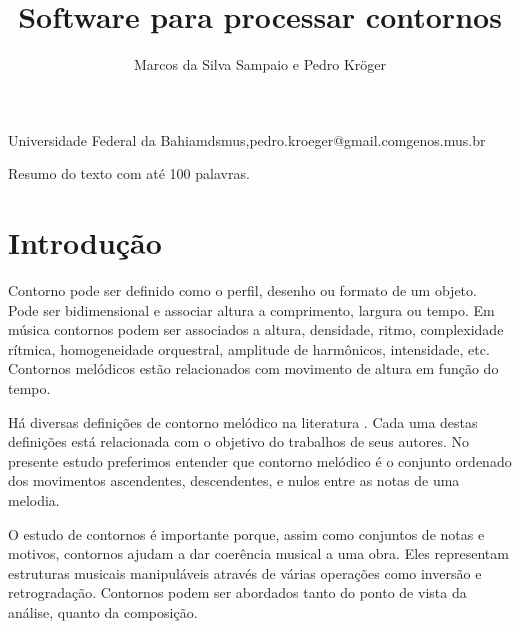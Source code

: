 \documentclass{article}
\begin{document}
\graphicspath{{figs-out/}{out/}}

\title{Software para processar contornos}
\author{Marcos da Silva Sampaio e Pedro Kröger}{Universidade Federal
  da Bahia}{{mdsmus,pedro.kroeger}@gmail.com}{genos.mus.br}

\begin{sumario}
  Resumo do texto com até 100 palavras.  
\end{sumario}








\section{Introdução}
\label{sec:introducao}

Contorno pode ser definido como o perfil, desenho ou formato de um
objeto. Pode ser bidimensional e associar altura a comprimento,
largura ou tempo. Em música contornos podem ser associados a altura,
densidade, ritmo, complexidade rítmica, homogeneidade orquestral,
amplitude de harmônicos, intensidade, etc. Contornos melódicos estão
relacionados com movimento de altura em função do tempo.

Há diversas definições de contorno melódico na literatura
\cite{piston59:harmony,toch77:shaping,schonberg:fundamentals,adams76:melodic,marvin.ea87:relating,morris87:composition,clifford95:contour,beard03:contour}. Cada
uma destas definições está relacionada com o objetivo do trabalhos de
seus autores. No presente estudo preferimos entender que contorno
melódico é o conjunto ordenado dos movimentos ascendentes,
descendentes, e nulos entre as notas de uma melodia.


O estudo de contornos é importante porque, assim como conjuntos de
notas e motivos, contornos ajudam a dar coerência musical a uma
obra. Eles representam estruturas musicais manipuláveis através de
várias operações como inversão e retrogradação. Contornos podem ser
abordados tanto do ponto de vista da análise, quanto da composição.
\end{document}
